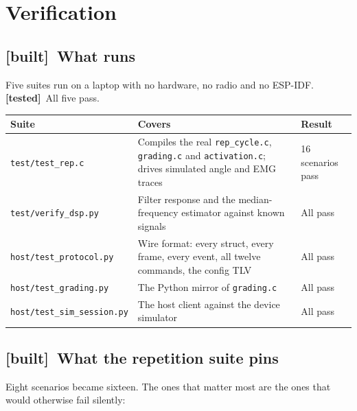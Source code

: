 \documentclass[11pt]{article}
\newcommand{\built}{{\sffamily\scriptsize\color{good}\textbf{[built]}}\ }
\newcommand{\tested}{{\sffamily\scriptsize\color{annot}\textbf{[tested]}}\ }
\begin{document}
\section{Verification}

\subsection{\built What runs}

Five suites run on a laptop with no hardware, no radio and no ESP-IDF.
\tested All five pass.

\begin{table}[H]
\centering\small
\begin{tabularx}{\linewidth}{@{}p{34mm} X p{18mm}@{}}
\toprule
\textbf{Suite} & \textbf{Covers} & \textbf{Result} \\
\midrule
\texttt{test/test\_rep.c} & Compiles the real \texttt{rep\_cycle.c}, \texttt{grading.c} and \texttt{activation.c}; drives simulated angle and EMG traces & 16 scenarios pass \\
\texttt{test/verify\_dsp.py} & Filter response and the median-frequency estimator against known signals & All pass \\
\texttt{host/test\_protocol.py} & Wire format: every struct, every frame, every event, all twelve commands, the config TLV & All pass \\
\texttt{host/test\_grading.py} & The Python mirror of \texttt{grading.c} & All pass \\
\texttt{host/test\_sim\_session.py} & The host client against the device simulator & All pass \\
\bottomrule
\end{tabularx}
\end{table}

\subsection{\built What the repetition suite pins}

Eight scenarios became sixteen. The ones that matter most are the ones that
would otherwise fail silently:
\end{document}

